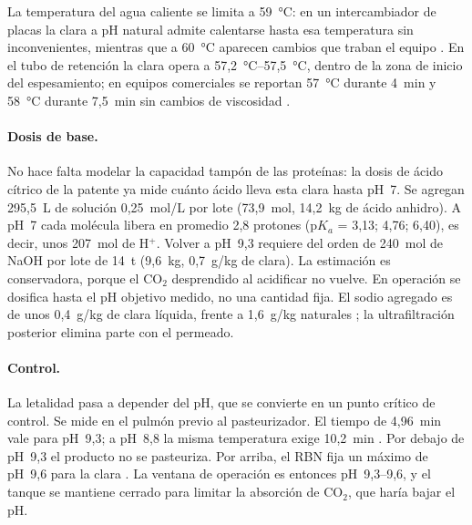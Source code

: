La temperatura del agua caliente se limita a 59~°C: en un intercambiador de
placas la clara a pH natural admite calentarse hasta esa temperatura sin
inconvenientes, mientras que a 60~°C aparecen cambios que traban el equipo
\parencite[p.~296]{cunningham1995pasteurization}. En el tubo de retención la clara opera
a 57,2~°C--57,5~°C, dentro de la zona de inicio del espesamiento;
en equipos comerciales se reportan 57~°C durante 4~min y
58~°C durante 7,5~min sin cambios de viscosidad
\parencite[pp.~296--297]{cunningham1995pasteurization}.

\paragraph{Dosis de base.} No hace falta modelar la capacidad tampón de las proteínas: la
dosis de ácido cítrico de la patente ya mide cuánto ácido lleva esta clara hasta pH~7.
Se agregan 295,5~L de solución 0,25~mol/L por lote
(73,9~mol, 14,2~kg de ácido anhidro). A pH~7 cada molécula libera
en promedio 2,8 protones (p$K_a$ = 3,13; 4,76; 6,40), es decir, unos
207~mol de H$^+$. Volver a pH~9,3 requiere del orden de
240~mol de NaOH por lote de 14~t
(9,6~kg, 0,7~g/kg de clara). La estimación es
conservadora, porque el CO$_2$ desprendido al acidificar no vuelve. En operación se
dosifica hasta el pH objetivo medido, no una cantidad fija. El sodio agregado es de unos
0,4~g/kg de clara líquida, frente a 1,6~g/kg
naturales \parencite[Tabla~1]{froning2002manual}; la ultrafiltración posterior elimina
parte con el permeado.

\paragraph{Control.} La letalidad pasa a depender del pH, que se convierte en un punto
crítico de control. Se mide en el pulmón previo al pasteurizador. El tiempo de
4,96~min vale para pH~9,3; a pH~8,8 la misma temperatura exige
10,2~min \parencite[Tabla~III.A]{fsis2026guideline}. Por debajo de pH~9,3 el
producto no se pasteuriza. Por arriba, el RBN fija un máximo de pH~9,6 para la clara
\parencite[art.~15.2.7]{rbn1994cap15}. La ventana de operación es entonces pH~9,3--9,6, y
el tanque se mantiene cerrado para limitar la absorción de CO$_2$, que haría bajar el
pH.

